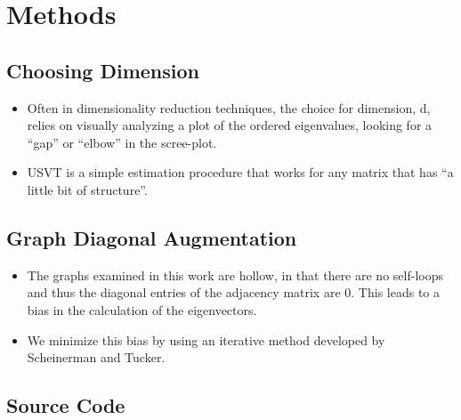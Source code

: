 \documentclass[a4paper]{article}
\begin{document}
\section{Methods}

\subsection{Choosing Dimension}
\label{section:dim_select}
\begin{itemize}
\item Often in dimensionality reduction techniques, the choice for dimension, d, relies on visually analyzing a plot of the ordered eigenvalues, looking for a ``gap'' or ``elbow'' in the scree-plot.
\item USVT is a simple estimation procedure that works for any matrix that has ``a little bit of structure''.
\end{itemize}

\subsection{Graph Diagonal Augmentation}
\label{section:diag_aug}
\begin{itemize}
\item The graphs examined in this work are hollow, in that there are no self-loops and thus the diagonal entries of the adjacency matrix are 0. This leads to a bias in the calculation of the eigenvectors.
\item We minimize this bias by using an iterative method developed by Scheinerman and Tucker.
\end{itemize}

\subsection{Source Code}
\end{document}
